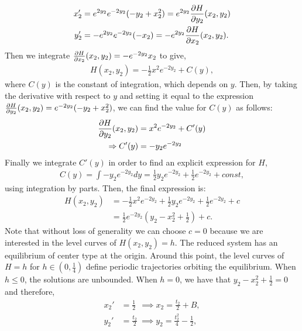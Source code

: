 \begin{align}
x_2' &=e^{2y_2}e^{-2y_2}( -y_2 +x_2^2 ) =e^{2y_2}\pd{H}{y_2}(x_2,y_2) \\
y_2' &= - e^{2y_2}e^{-2y_2}(-  x_2)=-e^{2y_2}\pd{H}{x_2}(x_2,y_2).
\end{align}
Then we integrate $ \pd{H}{x_2}(x_2,y_2) = -e^{-2y_2} x_2  $ to give,
\begin{align*}
 H(x_2,y_2) = - \frac{1}{2} x^2 e^{-2y_2} + C(y),
\end{align*}
where $C(y)$ is the constant of integration, which depends on $y$.
Then, by taking the derivative with respect to $y$ and setting it equal to the expression $\pd{H}{y_2}(x_2,y_2)=e^{-2y_2}( -y_2 +x_2^2 )$, we can find the value for $C(y)$ as follows: 
\begin{align*}
\pd{H}{y_2}(x_2,y_2)&= x^2 e^{-2y_2} + C'(y)\\
\Rightarrow C'(y) &= - y_2 e^{-2y_2}
\end{align*}
Finally we integrate $C'(y)$ in order to find an explicit expression for $H$,
\begin{align*}
C(y) = \int - y_2 e^{-2y_2} dy = \frac{1}{2} y_2 e^{-2y_2} + \frac{1}{2} e^{-2y_2} + const,
\end{align*}
using integration by parts.
Then, the final expression is:
\begin{align}
H(x_2,y_2)&=- \frac{1}{2} x^2 e^{-2y_2} + \frac{1}{2} y_2 e^{-2y_2} + \frac{1}{2} e^{-2y_2} + c\\
&= \frac{1}{2}e^{-2y_2}\left(y_2-x^2_2+\frac{1}{2}\right) +c. \label{eq: const of motion}
\end{align}
Note that without loss of generality we can choose $c=0$ because we are interested in the level curves of $H(x_2,y_2)=h$. The reduced system has an equilibrium of center type at the origin. Around this point, the level curves of $H=h$ for $h \in (0,\frac{1}{4})$ define periodic trajectories orbiting the equilibrium. When $h\leq0$, the solutions are unbounded. When $h=0$, we have that $y_2-x_2^2+\frac{1}{2}=0$ and therefore,
\begin{subequations}
	\begin{align}
	x_2'&=\frac{1}{2}\ \	\implies x_2=\frac{t_2}{2}+B, \label{canard: trajectory x}\\
	y_2'&=\frac{t_2}{2}\ \implies y_2=\frac{t_2^2}{4}-\frac{1}{2}, \label{canard: trajectory y}
	\end{align}
\end{subequations} 
